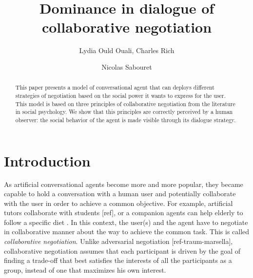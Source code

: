 \documentclass{llncs}
\begin{document}
	\title{\vskip -10pt Dominance in dialogue of collaborative negotiation}
	
	\author{Lydia Ould Ouali, Charles Rich \and
		Nicolas Sabouret }
	

	\maketitle
	
	\begin{abstract}
		This paper presents a model of conversational agent that can deploys different strategies of negotiation based on the social power it wants to express for the user. This model is based on three principles of collaborative negotiation from the literature in social psychology. We show that this principles are correctly perceived by a human observer: the social behavior of the agent is made visible through its dialogue strategy.
	\end{abstract}
	
	\section{Introduction}
	As artificial conversational agents become more and more popular, they became capable to hold a conversation with a human user and potentially collaborate with the user in order to achieve a common objective. For example, artificial tutors collaborate with students [ref], or a companion agents can help elderly to follow a specific diet \cite{kidd2005sociable}. In this context, the user(s) and the agent have to negotiate in collaborative manner about the way to achieve the common task. This is called \emph{collaborative negotiation}. Unlike adversarial negotiation [ref-traum-marsella], collaborative negotiation assumes that each participant is driven by the goal of finding a trade-off that best satisfies the interests of all the participants as a group, instead of one that maximizes his own interest\cite{sidnerartificial,chu1995response}.
	
\end{document}
